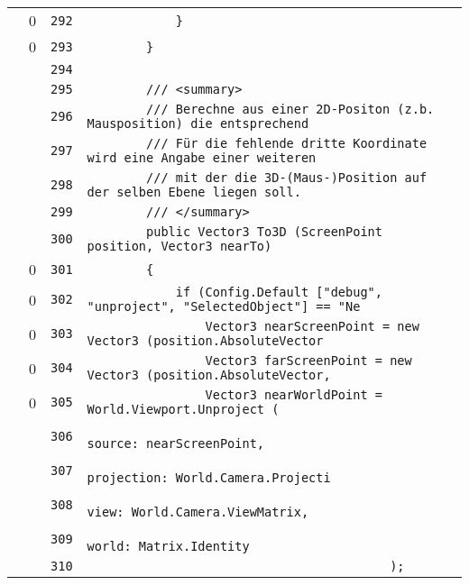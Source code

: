 \documentclass[a4paper,10pt]{article}
\begin{document}
\begin{longtable}[l]{lrrl}
\cellcolor{red} & 0 & \verb~292~ & \verb~            }~\\
\cellcolor{red} & 0 & \verb~293~ & \verb~        }~\\
\cellcolor{gray} &  & \verb~294~ & \verb~~\\
\cellcolor{gray} &  & \verb~295~ & \verb~        /// <summary>~\\
\cellcolor{gray} &  & \verb~296~ & \verb~        /// Berechne aus einer 2D-Positon (z.b. Mausposition) die entsprechend~\\
\cellcolor{gray} &  & \verb~297~ & \verb~        /// Für die fehlende dritte Koordinate wird eine Angabe einer weiteren~\\
\cellcolor{gray} &  & \verb~298~ & \verb~        /// mit der die 3D-(Maus-)Position auf der selben Ebene liegen soll.~\\
\cellcolor{gray} &  & \verb~299~ & \verb~        /// </summary>~\\
\cellcolor{gray} &  & \verb~300~ & \verb~        public Vector3 To3D (ScreenPoint position, Vector3 nearTo)~\\
\cellcolor{red} & 0 & \verb~301~ & \verb~        {~\\
\cellcolor{red} & 0 & \verb~302~ & \verb~            if (Config.Default ["debug", "unproject", "SelectedObject"] == "Ne~\\
\cellcolor{red} & 0 & \verb~303~ & \verb~                Vector3 nearScreenPoint = new Vector3 (position.AbsoluteVector~\\
\cellcolor{red} & 0 & \verb~304~ & \verb~                Vector3 farScreenPoint = new Vector3 (position.AbsoluteVector,~\\
\cellcolor{red} & 0 & \verb~305~ & \verb~                Vector3 nearWorldPoint = World.Viewport.Unproject (~\\
\cellcolor{gray} &  & \verb~306~ & \verb~                                             source: nearScreenPoint,~\\
\cellcolor{gray} &  & \verb~307~ & \verb~                                             projection: World.Camera.Projecti~\\
\cellcolor{gray} &  & \verb~308~ & \verb~                                             view: World.Camera.ViewMatrix,~\\
\cellcolor{gray} &  & \verb~309~ & \verb~                                             world: Matrix.Identity~\\
\cellcolor{gray} &  & \verb~310~ & \verb~                                         );~\\

\end{longtable}
\end{document}
